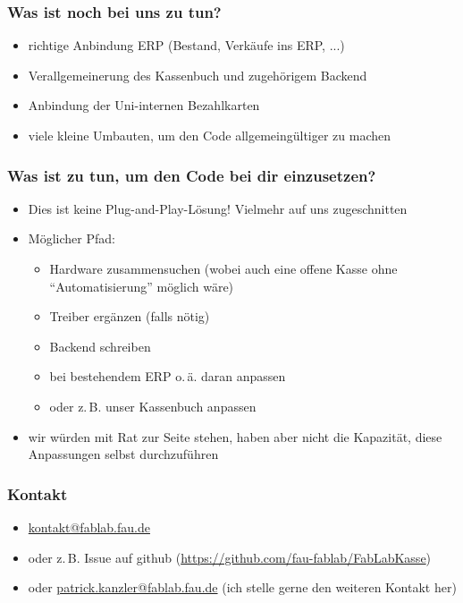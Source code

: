 \documentclass[german]{beamer} %
\begin{document}
\begin{frame}
\frametitle{Was ist noch bei uns zu tun?}
 \begin{itemize}
   \item richtige Anbindung ERP (Bestand, Verkäufe ins ERP, ...)
   \item Verallgemeinerung des Kassenbuch und zugehörigem Backend
   \item Anbindung der Uni-internen Bezahlkarten
   \item viele kleine Umbauten, um den Code allgemeingültiger zu machen
 \end{itemize} 
\end{frame}

\begin{frame}
\frametitle{Was ist zu tun, um den Code bei dir einzusetzen?}
  \begin{itemize}
    \item Dies ist keine Plug-and-Play-Lösung! Vielmehr auf uns zugeschnitten
    \item Möglicher Pfad:
      \begin{itemize}
         \item Hardware zusammensuchen (wobei auch eine offene Kasse ohne \enquote{Automatisierung} möglich wäre)
         \item Treiber ergänzen (falls nötig)
         \item Backend schreiben
         \item bei bestehendem ERP o.\,ä. daran anpassen
         \item oder z.\,B. unser Kassenbuch anpassen
      \end{itemize}
    \item wir würden mit Rat zur Seite stehen, haben aber nicht die Kapazität, diese Anpassungen selbst durchzuführen
  \end{itemize}
\end{frame}

\begin{frame}
\frametitle{Kontakt}
 \begin{itemize}
  \item \url{kontakt@fablab.fau.de}
  \item oder z.\,B. Issue auf github (\url{https://github.com/fau-fablab/FabLabKasse})
  \item oder \url{patrick.kanzler@fablab.fau.de} (ich stelle gerne den weiteren Kontakt her)
 \end{itemize}
\end{frame}
\end{document}
